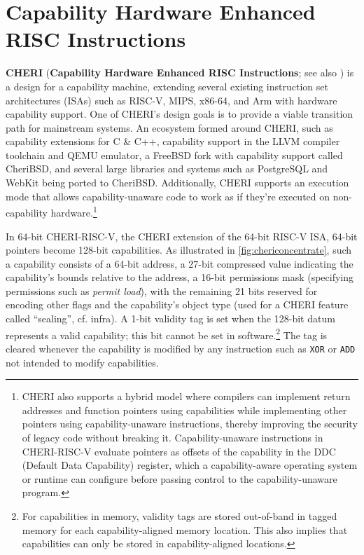 \documentclass[main.tex]{subfiles}
\begin{document}
\section{Capability Hardware Enhanced RISC Instructions}
\textbf{CHERI} (\textbf{Capability Hardware Enhanced RISC Instructions}; see also \cite{intro2cheri}) is a design for a capability machine, extending several existing instruction set architectures (ISAs) such as RISC-V, MIPS, x86-64, and Arm with hardware capability support. One of CHERI’s design goals is to provide a viable transition path for mainstream systems. An ecosystem formed around CHERI, such as capability extensions for C \& C++, capability support in the LLVM compiler toolchain and QEMU emulator, a FreeBSD fork with capability support called CheriBSD, and several large libraries and systems such as PostgreSQL and WebKit being ported to CheriBSD. Additionally, CHERI supports an execution mode that allows capability-unaware code to work as if they're executed on non-capability hardware.\footnote{CHERI also supports a hybrid model where compilers can implement return addresses and function pointers using capabilities while implementing other pointers using capability-unaware instructions, thereby improving the security of legacy code without breaking it. Capability-unaware instructions in CHERI-RISC-V evaluate pointers as offsets of the capability in the DDC (Default Data Capability) register, which a capability-aware operating system or runtime can configure before passing control to the capability-unaware program.}

In 64-bit CHERI-RISC-V, the CHERI extension of the 64-bit RISC-V ISA, 64-bit pointers become 128-bit capabilities. As illustrated in \cref{fig:chericoncentrate}, such a capability consists of a 64-bit address, a 27-bit compressed value indicating the capability’s bounds relative to the address, a 16-bit permissions mask (specifying permissions such as \emph{permit load}), with the remaining 21 bits reserved for encoding other flags and the capability’s object type (used for a CHERI feature called \enquote{\gls*{sealing}}, cf. infra). A 1-bit validity tag is set when the 128-bit datum represents a valid capability; this bit cannot be set in software.\footnote{For capabilities in memory, validity tags are stored out-of-band in tagged memory for each capability-aligned memory location. This also implies that capabilities can only be stored in capability-aligned locations.} The tag is cleared whenever the capability is modified by any instruction such as \texttt{XOR} or \texttt{ADD} not intended to modify capabilities.
\end{document}

